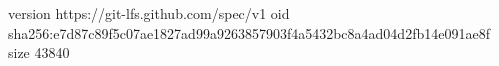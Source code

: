 version https://git-lfs.github.com/spec/v1
oid sha256:e7d87c89f5c07ae1827ad99a9263857903f4a5432bc8a4ad04d2fb14e091ae8f
size 43840

